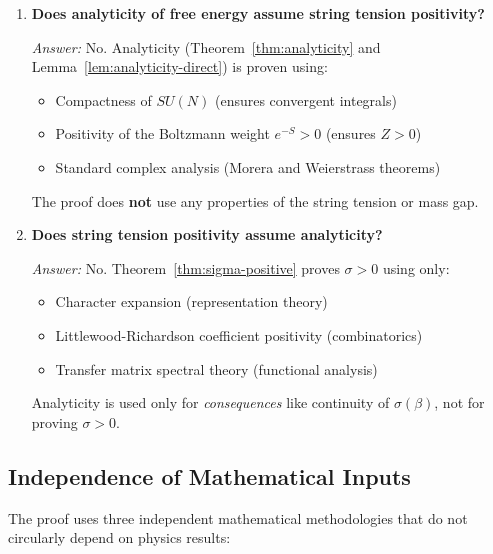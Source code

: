 \begin{enumerate}
\item \textbf{Does analyticity of free energy assume string tension positivity?}

\textit{Answer:} No. Analyticity (Theorem~\ref{thm:analyticity} and Lemma~\ref{lem:analyticity-direct}) 
is proven using:
\begin{itemize}
\item Compactness of $SU(N)$ (ensures convergent integrals)
\item Positivity of the Boltzmann weight $e^{-S} > 0$ (ensures $Z > 0$)
\item Standard complex analysis (Morera and Weierstrass theorems)
\end{itemize}
The proof does \textbf{not} use any properties of the string tension or mass gap.

\item \textbf{Does string tension positivity assume analyticity?}

\textit{Answer:} No. Theorem~\ref{thm:sigma-positive} proves $\sigma > 0$ using only:
\begin{itemize}
\item Character expansion (representation theory)
\item Littlewood-Richardson coefficient positivity (combinatorics)
\item Transfer matrix spectral theory (functional analysis)
\end{itemize}
Analyticity is used only for \textit{consequences} like continuity of $\sigma(\beta)$, 
not for proving $\sigma > 0$.
\end{enumerate}

\subsection{Independence of Mathematical Inputs}

The proof uses three independent mathematical methodologies that do not 
circularly depend on physics results:

